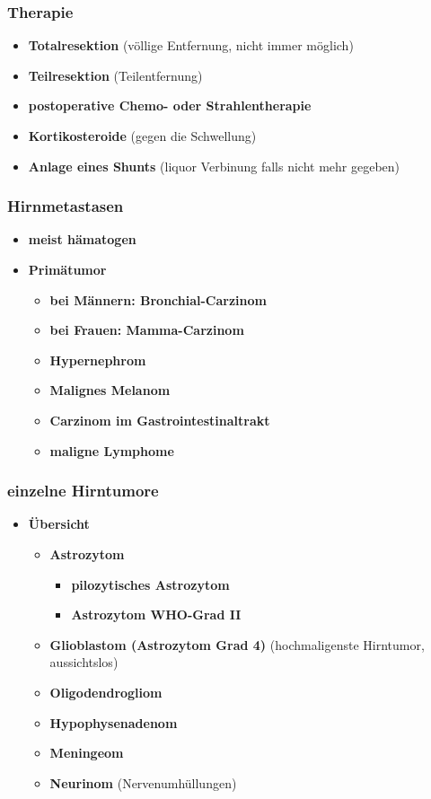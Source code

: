 	\subsubsection{Therapie}
		\begin{itemize}
			\item \textbf{Totalresektion} (völlige Entfernung, nicht immer möglich)
			\item \textbf{Teilresektion} (Teilentfernung)
			\item \textbf{postoperative Chemo- oder Strahlentherapie}
			\item \textbf{Kortikosteroide} (gegen die Schwellung)
			\item \textbf{Anlage eines Shunts} (liquor Verbinung falls nicht mehr gegeben)
		\end{itemize}
	\subsubsection{Hirnmetastasen}
		\begin{itemize}
			\item \textbf{meist hämatogen}
			\item \textbf{Primätumor}
				\begin{itemize}
					\item \textbf{bei Männern: Bronchial-Carzinom}
					\item \textbf{bei Frauen: Mamma-Carzinom}
					\item \textbf{Hypernephrom}
					\item \textbf{Malignes Melanom}
					\item \textbf{Carzinom im Gastrointestinaltrakt}
					\item \textbf{maligne Lymphome}
				\end{itemize}
		\end{itemize}
	\subsubsection{einzelne Hirntumore}
		\begin{itemize}
			\item \textbf{Übersicht}
				\begin{itemize}
					\item \textbf{Astrozytom}
						\begin{itemize}
							\item \textbf{pilozytisches Astrozytom}
							\item \textbf{Astrozytom WHO-Grad II}
						\end{itemize}					
					\item \textbf{Glioblastom (Astrozytom Grad 4)} (hochmaligenste Hirntumor, aussichtslos)
					\item \textbf{Oligodendrogliom}
					\item \textbf{Hypophysenadenom}
					\item \textbf{Meningeom} 
					\item \textbf{Neurinom} (Nervenumhüllungen)
				\end{itemize}
		\end{itemize}

